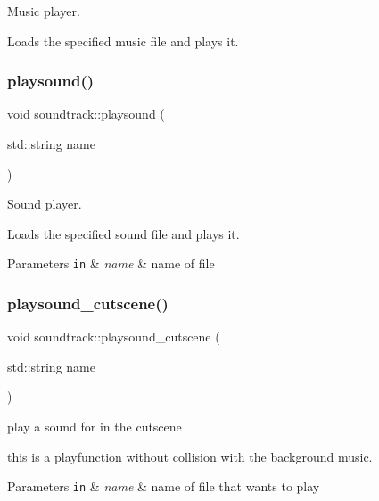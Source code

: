 Music player. 

Loads the specified music file and plays it. \mbox{\label{classsoundtrack_aa18de6469aca15922cfa8a8e8412f76d}} 
\subsubsection{\texorpdfstring{playsound()}{playsound()}}
{\footnotesize\ttfamily void soundtrack\+::playsound (\begin{DoxyParamCaption}\item[{std\+::string}]{name }\end{DoxyParamCaption})}



Sound player. 

Loads the specified sound file and plays it.


\begin{DoxyParams}[1]{Parameters}
\mbox{\tt in}  & {\em name} & name of file \\
\hline
\end{DoxyParams}
\mbox{\label{classsoundtrack_a83744518feb748a979a67a56fae997fe}} 
\subsubsection{\texorpdfstring{playsound\+\_\+cutscene()}{playsound\_cutscene()}}
{\footnotesize\ttfamily void soundtrack\+::playsound\+\_\+cutscene (\begin{DoxyParamCaption}\item[{std\+::string}]{name }\end{DoxyParamCaption})}



play a sound for in the cutscene 

this is a playfunction without collision with the background music.


\begin{DoxyParams}[1]{Parameters}
\mbox{\tt in}  & {\em name} & name of file that wants to play \\
\hline
\end{DoxyParams}
\mbox{\label{classsoundtrack_a9f25fee4c6d5dbc820e2a18b13b43e68}} 
